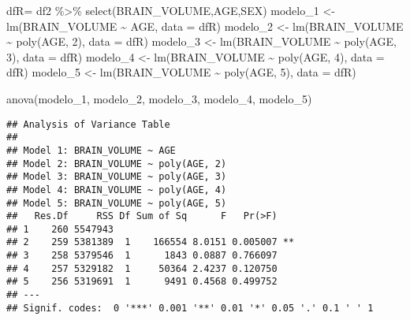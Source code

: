 \documentclass[
]{article}
\newenvironment{Shaded}{\begin{snugshade}}{\end{snugshade}}
\newcommand{\AttributeTok}[1]{\textcolor[rgb]{0.77,0.63,0.00}{#1}}
\newcommand{\DecValTok}[1]{\textcolor[rgb]{0.00,0.00,0.81}{#1}}
\newcommand{\FunctionTok}[1]{\textcolor[rgb]{0.00,0.00,0.00}{#1}}
\newcommand{\NormalTok}[1]{#1}
\newcommand{\OtherTok}[1]{\textcolor[rgb]{0.56,0.35,0.01}{#1}}
\newcommand{\SpecialCharTok}[1]{\textcolor[rgb]{0.00,0.00,0.00}{#1}}
\begin{document}
\begin{Shaded}
\begin{Highlighting}[]
\NormalTok{dfR}\OtherTok{=}\NormalTok{ df2 }\SpecialCharTok{\%\textgreater{}\%} \FunctionTok{select}\NormalTok{(BRAIN\_VOLUME,AGE,SEX) }
\NormalTok{modelo\_1 }\OtherTok{\textless{}{-}} \FunctionTok{lm}\NormalTok{(BRAIN\_VOLUME }\SpecialCharTok{\textasciitilde{}}\NormalTok{ AGE, }\AttributeTok{data =}\NormalTok{ dfR)}
\NormalTok{modelo\_2 }\OtherTok{\textless{}{-}} \FunctionTok{lm}\NormalTok{(BRAIN\_VOLUME }\SpecialCharTok{\textasciitilde{}} \FunctionTok{poly}\NormalTok{(AGE, }\DecValTok{2}\NormalTok{), }\AttributeTok{data =}\NormalTok{ dfR)}
\NormalTok{modelo\_3 }\OtherTok{\textless{}{-}} \FunctionTok{lm}\NormalTok{(BRAIN\_VOLUME }\SpecialCharTok{\textasciitilde{}} \FunctionTok{poly}\NormalTok{(AGE, }\DecValTok{3}\NormalTok{), }\AttributeTok{data =}\NormalTok{ dfR)}
\NormalTok{modelo\_4 }\OtherTok{\textless{}{-}} \FunctionTok{lm}\NormalTok{(BRAIN\_VOLUME }\SpecialCharTok{\textasciitilde{}} \FunctionTok{poly}\NormalTok{(AGE, }\DecValTok{4}\NormalTok{), }\AttributeTok{data =}\NormalTok{ dfR)}
\NormalTok{modelo\_5 }\OtherTok{\textless{}{-}} \FunctionTok{lm}\NormalTok{(BRAIN\_VOLUME }\SpecialCharTok{\textasciitilde{}} \FunctionTok{poly}\NormalTok{(AGE, }\DecValTok{5}\NormalTok{), }\AttributeTok{data =}\NormalTok{ dfR)}

\FunctionTok{anova}\NormalTok{(modelo\_1, modelo\_2, modelo\_3, modelo\_4, modelo\_5)}
\end{Highlighting}
\end{Shaded}

\begin{verbatim}
## Analysis of Variance Table
## 
## Model 1: BRAIN_VOLUME ~ AGE
## Model 2: BRAIN_VOLUME ~ poly(AGE, 2)
## Model 3: BRAIN_VOLUME ~ poly(AGE, 3)
## Model 4: BRAIN_VOLUME ~ poly(AGE, 4)
## Model 5: BRAIN_VOLUME ~ poly(AGE, 5)
##   Res.Df     RSS Df Sum of Sq      F   Pr(>F)   
## 1    260 5547943                                
## 2    259 5381389  1    166554 8.0151 0.005007 **
## 3    258 5379546  1      1843 0.0887 0.766097   
## 4    257 5329182  1     50364 2.4237 0.120750   
## 5    256 5319691  1      9491 0.4568 0.499752   
## ---
## Signif. codes:  0 '***' 0.001 '**' 0.01 '*' 0.05 '.' 0.1 ' ' 1
\end{verbatim}
\end{document}
